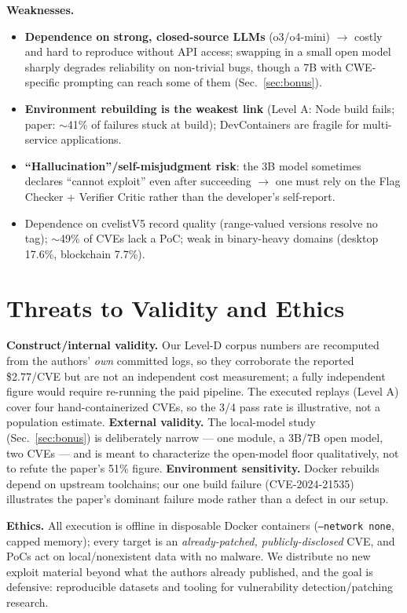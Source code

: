 \documentclass[conference,10pt,a4paper]{IEEEtran}
\newcommand{\code}[1]{\texttt{\small #1}}
\begin{document}
\textbf{Weaknesses.}
\begin{itemize}
\item \textbf{Dependence on strong, closed-source LLMs} (o3/o4-mini) $\to$ costly and hard to reproduce without API access; swapping in a small open model sharply degrades reliability on non-trivial bugs, though a 7B with CWE-specific prompting can reach some of them (Sec.~\ref{sec:bonus}).
\item \textbf{Environment rebuilding is the weakest link} (Level A: Node build fails; paper: $\sim$41\% of failures stuck at build); DevContainers are fragile for multi-service applications.
\item \textbf{``Hallucination''/self-misjudgment risk}: the 3B model sometimes declares ``cannot exploit'' even after succeeding $\to$ one must rely on the Flag Checker + Verifier Critic rather than the developer's self-report.
\item Dependence on cvelistV5 record quality (range-valued versions resolve no tag); $\sim$49\% of CVEs lack a PoC; weak in binary-heavy domains (desktop 17.6\%, blockchain 7.7\%).
\end{itemize}

\section{Threats to Validity and Ethics}
\textbf{Construct/internal validity.} Our Level-D corpus numbers are recomputed from the authors' \textit{own} committed logs, so they corroborate the reported \$2.77/CVE but are not an independent cost measurement; a fully independent figure would require re-running the paid pipeline. The executed replays (Level A) cover four hand-containerized CVEs, so the 3/4 pass rate is illustrative, not a population estimate. \textbf{External validity.} The local-model study (Sec.~\ref{sec:bonus}) is deliberately narrow --- one module, a 3B/7B open model, two CVEs --- and is meant to characterize the open-model floor qualitatively, not to refute the paper's 51\% figure. \textbf{Environment sensitivity.} Docker rebuilds depend on upstream toolchains; our one build failure (CVE-2024-21535) illustrates the paper's dominant failure mode rather than a defect in our setup.

\textbf{Ethics.} All execution is offline in disposable Docker containers (\code{--network none}, capped memory); every target is an \textit{already-patched, publicly-disclosed} CVE, and PoCs act on local/nonexistent data with no malware. We distribute no new exploit material beyond what the authors already published, and the goal is defensive: reproducible datasets and tooling for vulnerability detection/patching research.
\end{document}
